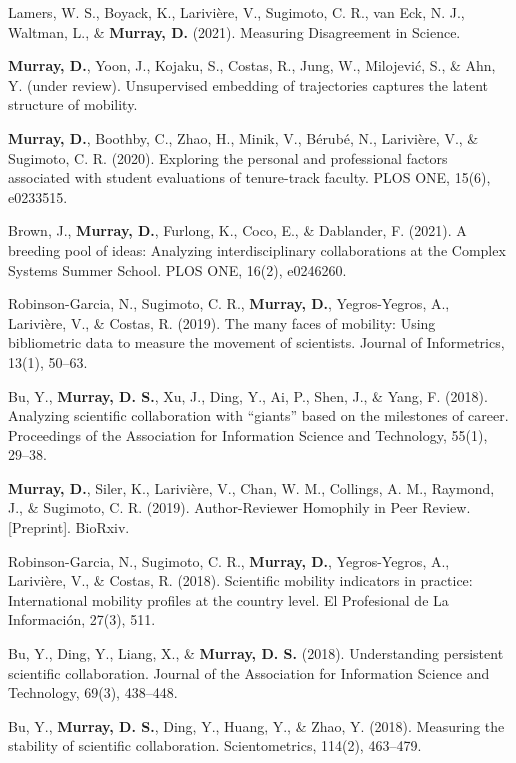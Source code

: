 \documentclass[10pt, a4paper]{article}
\newcommand{\years}[1]{\marginnote{\scriptsize #1}}
\begin{document}
\years{---}  \hangindent=0.7cm Lamers, W. S., Boyack, K., Larivière, V., Sugimoto, C. R., van Eck, N. J., Waltman, L., \& \textbf{Murray, D.} (2021). Measuring Disagreement in Science.

\years{---} \hangindent=0.7cm \textbf{Murray, D.}, Yoon, J., Kojaku, S., Costas, R., Jung, W., Milojević, S., \& Ahn, Y. (under review). Unsupervised embedding of trajectories captures the
latent structure of mobility.

\years{2020} \hangindent=0.7cm \textbf{Murray, D.}, Boothby, C., Zhao, H., Minik, V., Bérubé, N., Larivière, V., \& Sugimoto, C. R. (2020). Exploring the personal and professional factors associated with student evaluations of tenure-track faculty. PLOS ONE, 15(6), e0233515. 

\years{2020} \hangindent=0.7cm Brown, J., \textbf{Murray, D.}, Furlong, K., Coco, E., \& Dablander, F. (2021). A breeding pool of ideas: Analyzing interdisciplinary collaborations at the Complex Systems Summer School. PLOS ONE, 16(2), e0246260.

\years{2019} \hangindent=0.7cm Robinson-Garcia, N., Sugimoto, C. R., \textbf{Murray, D.}, Yegros-Yegros, A., Larivière, V., \& Costas, R. (2019). The many faces of mobility: Using bibliometric data to measure the movement of scientists. Journal of Informetrics, 13(1), 50–63. 

\years{2019} \hangindent=0.7cm Bu, Y., \textbf{Murray, D. S.}, Xu, J., Ding, Y., Ai, P., Shen, J., \& Yang, F. (2018). Analyzing scientific collaboration with “giants” based on the milestones of career. Proceedings of the Association for Information Science and Technology, 55(1), 29–38. 

\years{2019} \hangindent=0.7cm \textbf{Murray, D.}, Siler, K., Larivière, V., Chan, W. M., Collings, A. M., Raymond, J., \& Sugimoto, C. R. (2019). Author-Reviewer Homophily in Peer Review.[Preprint]. BioRxiv.  

\years{2018} \hangindent=0.7cm Robinson-Garcia, N., Sugimoto, C. R., \textbf{Murray, D.}, Yegros-Yegros, A., Larivière, V., \& Costas, R. (2018). Scientific mobility indicators in practice: International mobility profiles at the country level. El Profesional de La Información, 27(3), 511. 

\years{2018} \hangindent=0.7cm Bu, Y., Ding, Y., Liang, X., \& \textbf{Murray, D. S. }(2018). Understanding persistent scientific collaboration. Journal of the Association for Information Science and Technology, 69(3), 438–448. 

\years{2018} \hangindent=0.7cm Bu, Y., \textbf{Murray, D. S.}, Ding, Y., Huang, Y., \& Zhao, Y. (2018). Measuring the stability of scientific collaboration. Scientometrics, 114(2), 463–479. 
\end{document}

